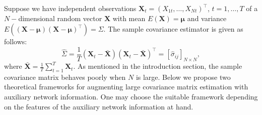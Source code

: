 Suppose we have independent observations $\boldsymbol{X}_{t}=(X_{1t},\dots,X_{Nt})^{\intercal}$, $t=1,\dots,T$ of a $N-$dimensional random vector $\boldsymbol{X}$ with mean $E(\boldsymbol{X})=\boldsymbol{\mu}$ and variance $E((\boldsymbol{X}-\boldsymbol{\mu})(\boldsymbol{X}-\boldsymbol{\mu})^{\intercal})={\Sigma}$. The sample covariance estimator is given as follows:
\begin{equation}
\hat{\Sigma}=\frac{1}{T}(\boldsymbol{X}_{t}-\bar{\boldsymbol{X}})(\boldsymbol{X}_{t}-\bar{\boldsymbol{X}})^{\intercal}=[\hat{\sigma}_{ij}]_{N\times N},
\end{equation}
where $\bar{\boldsymbol{X}}=\frac{1}{T}\sum_{t=1}^T\boldsymbol{X}_{t}$. As mentioned in the introduction section, the sample covariance matrix behaves poorly when $N$ is large. Below we propose two theoretical frameworks for augmenting large covariance matrix estimation with auxiliary network information. One may choose the suitable framework depending on the features of
the auxiliary network information at hand.

